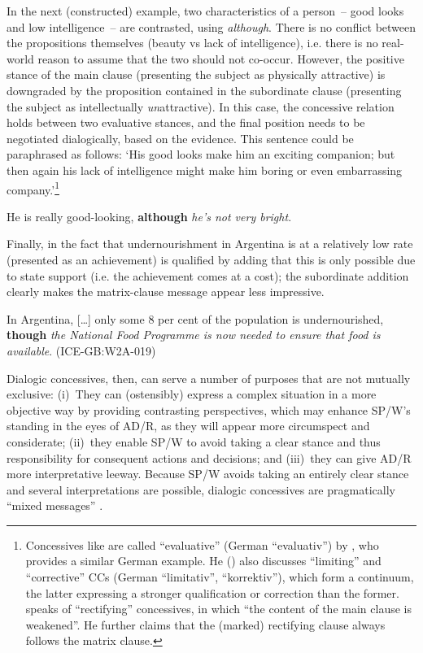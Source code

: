 In the next (constructed) example, two characteristics of a person~– good looks and low intelligence~– are contrasted, using \textit{although}. There is no conflict between the propositions themselves (beauty vs lack of intelligence), i.e. there is no real-world reason to assume that the two should not co-occur. However, the positive stance of the main clause (presenting the subject as physically attractive) is downgraded by the proposition contained in the subordinate clause (presenting the subject as intellectually \textit{un}attractive). In this case, the concessive relation holds between two evaluative stances, and the final position needs to be negotiated dialogically, based on the evidence. This sentence could be paraphrased as follows: ‘His good looks make him an exciting companion; but then again his lack of intelligence might make him boring or even embarrassing company.’\footnote{Concessives like  are called “evaluative” (German “evaluativ”) by \citet[345]{DiMeola1998}, who provides a similar German example. He (\citeyear[347–348]{DiMeola1998}) also discusses “limiting” and “corrective” CCs (German “limitativ”, “korrektiv”), which form a continuum, the latter expressing a stronger qualification or correction than the former. \citet[823–824]{König2006} speaks of “rectifying” concessives, in which “the content of the main clause is weakened”. He further claims that the (marked) rectifying clause always follows the matrix clause.}

\ea\label{ex:20}\label{bkm:Ref427176372}He is really good-looking, \textbf{although} \textit{he’s not very bright}.\\
\z

Finally, in  the fact that undernourishment in Argentina is at a relatively low rate (presented as an achievement) is qualified by adding that this is only possible due to state support (i.e. the achievement comes at a cost); the subordinate addition clearly makes the matrix-clause message appear less impressive.

\eanoraggedright\label{ex:21}\label{bkm:Ref427227390}\sloppy In Argentina, […] only some 8 per cent of the population is under\-nourished, \textbf{though} \textit{the National Food Programme is now needed to ensure that food is available}. (ICE-GB:W2A-019)
\z

Dialogic concessives, then, can serve a number of purposes that are not mutually exclusive:
(i)~They can (ostensibly) express a complex situation in a more objective way by providing contrasting perspectives, which may enhance SP/W’s standing in the eyes of AD/R, as they will appear more circumspect and considerate;
(ii)~they enable SP/W to avoid taking a clear stance and thus responsibility for consequent actions and decisions; and
(iii)~they can give AD/R more interpretative leeway. Because SP/W avoids taking an entirely clear stance and several interpretations are possible, dialogic concessives are pragmatically “mixed messages” \citep[166]{Hilpert2013a}.

